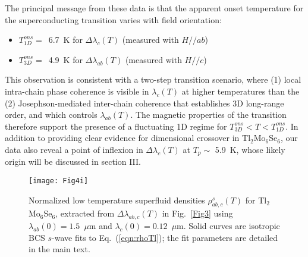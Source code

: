 \documentclass[prb,twocolumn,showpacs,preprintnumbers,amsmath,amssymb,floatfix,groupedaddress,superscriptaddress,aps,10pt]{revtex4-1}
\newcommand{\Tl}{Tl$_2$Mo$_6$Se$_6$}
\begin{document}
The principal message from these data is that the apparent onset temperature for the superconducting transition varies with field orientation: 

\begin{itemize}
	\item $T_{1D}^{ons}=$~6.7~K for $\Delta\lambda_c(T)$ (measured with $H/\!/ab$)
	\item $T_{3D}^{ons}=$~4.9~K for $\Delta\lambda_{ab}(T)$ (measured with $H/\!/c$)
\end{itemize}

This observation is consistent with a two-step transition scenario, where (1) local intra-chain phase coherence is visible in $\lambda_{c}(T)$ at higher temperatures than the (2) Josephson-mediated inter-chain coherence that establishes 3D long-range order, and which controls $\lambda_{ab}(T)$.  The magnetic properties of the transition therefore support the presence of a fluctuating 1D regime for $T_{3D}^{ons}<T<T_{1D}^{ons}$.  In addition to providing clear evidence for dimensional crossover in {\Tl}, our data also reveal a point of inflexion in $\Delta\lambda_{c}(T)$ at $T_p\sim$ 5.9~K, whose likely origin will be discussed in section III.  
 
\begin{figure}[tbp]
	\centering 
	\texttt{[image: Fig4i]}
	\caption{\label{Fig4} Normalized low temperature superfluid densities $\rho^s_{ab,c}(T)$ for {\Tl}, extracted from $\Delta\lambda_{ab,c}(T)$ in Fig.~\ref{Fig3} using $\lambda_{ab}(0)=1.5$~$\mu$m and $\lambda_{c}(0)=0.12$~$\mu$m. Solid curves are isotropic BCS $s$-wave fits to Eq.~(\ref{eqn:rhoTl}); the fit parameters are detailed in the main text.}
\end{figure}
\end{document}
